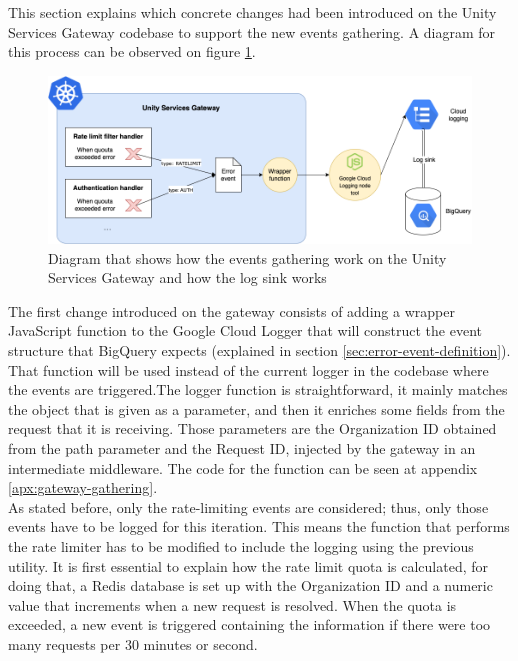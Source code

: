 \documentclass[english, 12pt, a4paper, sci, utf8, a-1b, online]{aaltothesis}
\begin{document}
This section explains which concrete changes had been introduced on the Unity Services Gateway codebase to support the new events gathering. A diagram for this process can be observed on figure \ref{fig:event-gathering}.\\

\begin{figure}[h!]
    \centering
    \includegraphics[scale=0.4]{src/thesis/img/technical-solution/events-gathering.png}
    \caption{Diagram that shows how the events gathering work on the Unity Services Gateway and how the log sink works}
    \label{fig:event-gathering}
\end{figure}

The first change introduced on the gateway consists of adding a wrapper JavaScript function to the Google Cloud Logger that will construct the event structure that BigQuery expects (explained in section \ref{sec:error-event-definition}). That function will be used instead of the current logger in the codebase where the events are triggered.The logger function is straightforward, it mainly matches the object that is given as a parameter, and then it enriches some fields from the request that it is receiving. Those parameters are the Organization ID obtained from the path parameter and the Request ID, injected by the gateway in an intermediate middleware. The code for the function can be seen at appendix \ref{apx:gateway-gathering}.\\

As stated before, only the rate-limiting events are considered; thus, only those events have to be logged for this iteration. This means the function that performs the rate limiter has to be modified to include the logging using the previous utility. It is first essential to explain how the rate limit quota is calculated, for doing that, a Redis database is set up with the Organization ID and a numeric value that increments when a new request is resolved. When the quota is exceeded, a new event is triggered containing the information if there were too many requests per 30 minutes or second.\\
\end{document}
